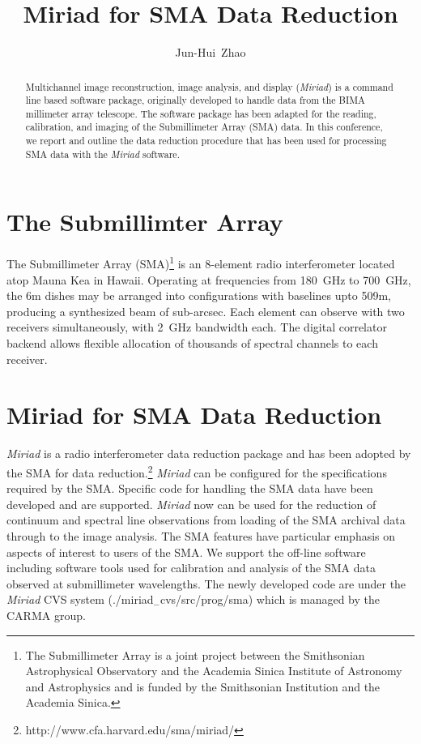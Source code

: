 
\resetcounters




\title{Miriad for SMA Data Reduction}
\author{Jun-Hui~Zhao
}


\begin{abstract}
Multichannel image reconstruction, image analysis, and display ({\it Miriad}) 
is a command line based software package, originally developed to handle 
data from the BIMA millimeter array telescope. The software package has been 
adapted for the reading, calibration, and imaging of the Submillimeter Array
(SMA)  data. In this conference, we report and outline the data reduction
procedure that has been used for processing SMA data with the {\it Miriad} 
software. 	 
\end{abstract}

\section{The Submillimter Array}
The Submillimeter Array (SMA)\footnote{The Submillimeter Array is a joint 
project between the Smithsonian
Astrophysical Observatory and the Academia Sinica Institute of Astronomy
and Astrophysics and is funded by the Smithsonian Institution and the
Academia Sinica.} is an 8-element radio interferometer located atop Mauna Kea 
in Hawaii. Operating at frequencies from 180~GHz to 700~GHz, the 6m dishes 
may be arranged into configurations with baselines upto 509m, producing a 
synthesized beam of sub-arcsec. Each element can observe with two receivers 
simultaneously, with 2~GHz bandwidth each. The digital correlator backend 
allows flexible allocation of thousands of spectral channels to each receiver.

\section{Miriad for SMA Data Reduction}
{\it Miriad} is a radio interferometer data reduction package \citep{stw95} 
and has been adopted by the SMA for data reduction.\footnote{http://www.cfa.harvard.edu/sma/miriad/} {\it Miriad} can be configured 
for the specifications required by the SMA. Specific code for handling 
the SMA data have been developed and are supported. {\it Miriad} now can be 
used for the reduction of continuum and spectral line observations from 
loading of the SMA archival data  through to the image analysis. The SMA 
features have particular emphasis on aspects of interest to users of the 
SMA. We support the off-line software including software tools used for 
calibration and analysis of the SMA data observed at submillimeter 
wavelengths. The newly developed code are under the
{\it Miriad} CVS system (./miriad$_{-}$cvs/src/prog/sma) 
which is managed by the CARMA group.

